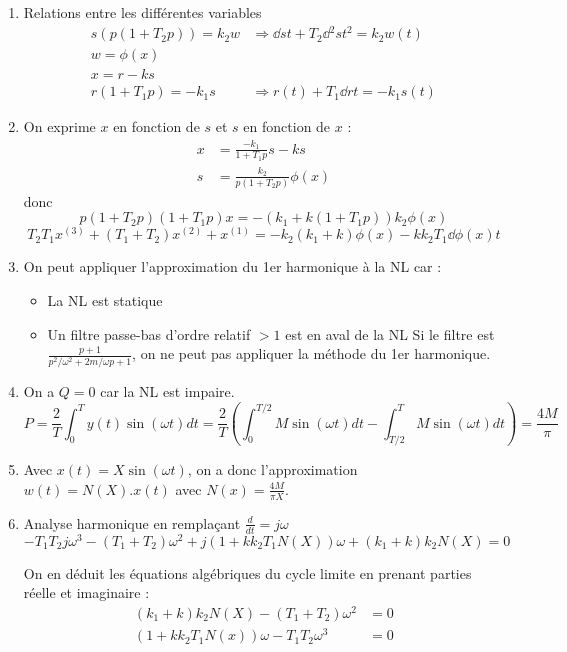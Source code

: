 \documentclass{../../td}{subfiles}
\begin{document}
\begin{enumerate}\setlength{\itemsep}{1cm}

\item Relations entre les différentes variables
\begin{align*}
s(p(1+T_2p)) = k_2 w & \Rightarrow \dd{s}{t} + T_2 \dd{^2 s}{t^2} = k_2 w(t) \\
w = \phi(x) & \\
x = r - ks & \\
r(1+T_1 p) = -k_1 s & \Rightarrow r(t) + T_1 \dd{r}{t} = -k_1 s(t)
\end{align*}

\item On exprime $x$ en fonction de $s$ et $s$ en fonction de $x$ :
\begin{align*}
x & = \frac{-k_1}{1+T_1 p} s - ks \\
s & = \frac{k_2}{p(1+T_2p)}\phi(x)
\end{align*}
donc
\[ p(1+T_2p)(1+T_1p)x = -(k_1+k(1+T_1p))k_2\phi(x) \]
\[ T_2T_1x^{(3)} + (T_1+T_2)x^{(2)} + x^{(1)} = -k_2(k_1+k)\phi(x)-kk_2T_1 \dd{\phi(x)}{t} \]

\item On peut appliquer l'approximation du 1er harmonique à la NL car :
\begin{itemize}
\item La NL est statique
\item Un filtre passe-bas d'ordre relatif $>1$ est en aval de la NL
Si le filtre est $\frac{p+1}{p^2 / \omega^2 + 2m/\omega p +1}$, on ne peut pas appliquer la méthode du 1er harmonique.

\end{itemize}

\item On a $Q=0$ car la NL est impaire.
\[ P = \frac{2}{T} \int_0^T y(t) \sin(\omega t) dt = \frac{2}{T} ( \int_0^{T/2} M\sin (\omega t) dt - \int_{T/2}^T M\sin(\omega t) dt) = \frac{4M}{\pi} \]

\item Avec $x(t)=X\sin(\omega t)$, on a donc l'approximation $w(t)=N(X).x(t)$ avec $N(x)=\frac{4M}{\pi X}$.

\item Analyse harmonique en remplaçant $\frac{d}{dt}=j\omega$
\[ -T_1T_2 j\omega^3 - (T_1+T_2) \omega^2 + j(1+kk_2T_1N(X)) \omega + (k_1+k)k_2N(X) = 0 \]

On en déduit les équations algébriques du cycle limite en prenant parties réelle et imaginaire :
\begin{align*}
(k_1+k)k_2 N(X)  - (T_1+T_2) \omega^2 & = 0 \\
(1+kk_2T_1N(x))\omega - T_1T_2 \omega^3 & =0
\end{align*}


\end{enumerate}
\end{document}
